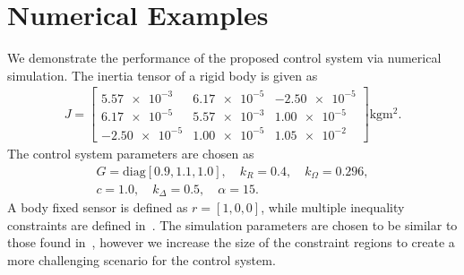 \documentclass[letterpaper, 10 pt, conference]{ieeeconf}  %
\begin{document}
\section{Numerical Examples}
We demonstrate the performance of the proposed control system via numerical simulation.
The inertia tensor of a rigid body is given as
\begin{gather*}
	J = \begin{bmatrix}
	\num{5.57e-3} & \num{6.17e-5} & \num{-2.50e-5} \\
	\num{6.17e-5} & \num{5.57e-3} & \num{1.00e-5} \\
	\num{-2.50e-5} & \num{1.00e-5} & \num{1.05e-2}
	\end{bmatrix} \si{\kilo\gram\meter\squared} .
\end{gather*} 
The control system parameters are chosen as
\begin{gather*}
	G = \text{diag} [0.9,1.1,1.0], \quad k_R = 0.4 , \quad	k_\Omega = 0.296 ,\\
	c = 1.0 , \quad k_\Delta = 0.5 , \quad \alpha = 15 .
\end{gather*}
A body fixed sensor is defined as \(r = [1,0,0]\), while multiple inequality constraints are defined in~.
The simulation parameters are chosen to be similar to those found in~\cite{lee2011b}, however we increase the size of the constraint regions to create a more challenging scenario for the control system.
\end{document}

